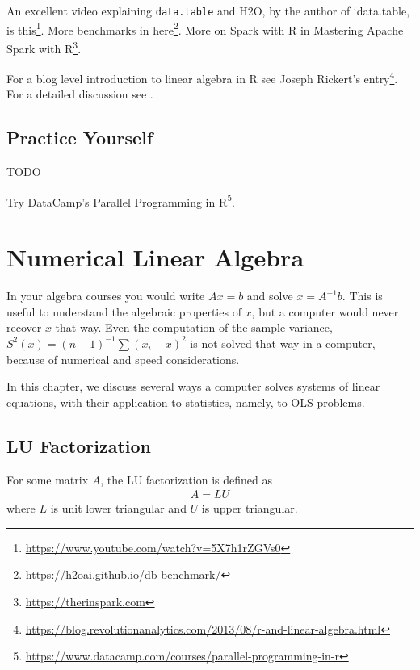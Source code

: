 \documentclass[]{book}
\renewcommand{\href}[2]{#2\footnote{\url{#1}}}
\theoremstyle{definition}
\theoremstyle{definition}
\theoremstyle{definition}
\theoremstyle{remark}
\let\BeginKnitrBlock\begin \let\EndKnitrBlock\end
\begin{document}
An excellent video explaining \texttt{data.table} and H2O, by the author of `data.table, is \href{https://www.youtube.com/watch?v=5X7h1rZGVs0}{this}.
More benchmarks in \href{https://h2oai.github.io/db-benchmark/}{here}.
More on Spark with R in \href{https://therinspark.com}{Mastering Apache Spark with R}.

For a blog level introduction to linear algebra in R see \href{https://blog.revolutionanalytics.com/2013/08/r-and-linear-algebra.html}{Joseph Rickert's entry}.
For a detailed discussion see \citet{oancea2015accelerating}.

\hypertarget{practice-yourself-12}{%
\section{Practice Yourself}\label{practice-yourself-12}}

TODO

Try DataCamp's \href{https://www.datacamp.com/courses/parallel-programming-in-r}{Parallel Programming in R}.

\hypertarget{algebra}{%
\chapter{Numerical Linear Algebra}\label{algebra}}

In your algebra courses you would write \(Ax=b\) and solve \(x=A^{-1}b\).
This is useful to understand the algebraic properties of \(x\), but a computer would never recover \(x\) that way.
Even the computation of the sample variance, \(S^2(x)=(n-1)^{-1}\sum (x_i-\bar x )^2\) is not solved that way in a computer, because of numerical and speed considerations.

In this chapter, we discuss several ways a computer solves systems of linear equations, with their application to statistics, namely, to OLS problems.

\hypertarget{lu-factorization}{%
\section{LU Factorization}\label{lu-factorization}}

\BeginKnitrBlock{definition}[LU Factorization]
\protect\hypertarget{def:lu}{}{\label{def:lu} {} }For some matrix \(A\), the LU factorization is defined as
\begin{align}
 A = L U 
\end{align}
where \(L\) is unit lower triangular and \(U\) is upper triangular.
\EndKnitrBlock{definition}
\end{document}
